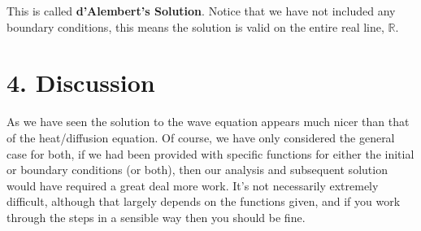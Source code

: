 \documentclass[11pt]{article}
\begin{document}
This is called \textbf{d'Alembert's Solution}. Notice that we have not included any boundary conditions, this means the solution is valid on the entire real line, $\mathbb{R}$. 

\section*{4. Discussion}
As we have seen the solution to the wave equation appears much nicer than that of the heat/diffusion equation. Of course, we have only considered the general case for both, if we had been provided with specific functions for either the initial or boundary conditions (or both), then our analysis and subsequent solution would have required a great deal more work. It's not necessarily extremely difficult, although that largely depends on the functions given, and if you work through the steps in a sensible way then you should be fine. 
\end{document}
